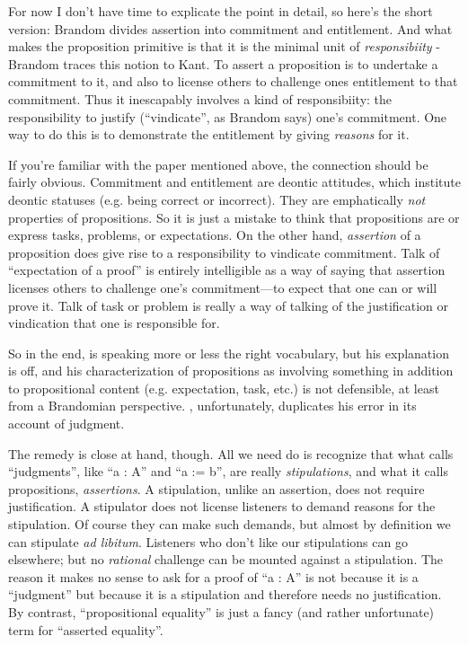 For now I don't have time to explicate the point in detail, so
here's the short version: Brandom divides assertion into commitment
and entitlement.  And what makes the proposition primitive is that
it is the minimal unit of \emph{responsibiity} - Brandom traces this
notion to Kant.  To assert a proposition is to undertake a
commitment to it, and also to license others to challenge ones
entitlement to that commitment.  Thus it inescapably involves a kind
of responsibiity: the responsibility to justify (``vindicate'', as
Brandom says) one's commitment.  One way to do this is to
demonstrate the entitlement by giving \emph{reasons} for it.

If you're familiar with the \ML{} paper mentioned above, the
connection should be fairly obvious.  Commitment and entitlement are
deontic attitudes, which institute deontic statuses (e.g. being
correct or incorrect).  They are emphatically \emph{not} properties
of propositions.  So it is just a mistake to think that propositions
are or express tasks, problems, or expectations.  On the other hand,
\emph{assertion} of a proposition does give rise to a responsibility
to vindicate commitment.  Talk of ``expectation of a proof'' is
entirely intelligible as a way of saying that assertion licenses
others to challenge one's commitment---to expect that one can or
will prove it.  Talk of task or problem is really a way of talking
of the justification or vindication that one is responsible
for.

So in the end, \ML{} is speaking more or less the right vocabulary,
but his explanation is off, and his characterization of propositions
as involving something in addition to propositional content
(e.g. expectation, task, etc.) is not defensible, at least from a
Brandomian perspective.  \HoTT{}, unfortunately, duplicates his
error in its account of judgment.

The remedy is close at hand, though.  All we need do is recognize that
what \HoTTB calls ``judgments'', like ``a : A'' and ``a := b'', are
really \emph{stipulations}, and what it calls propositions,
\emph{assertions}.  A stipulation, unlike an assertion, does not
require justification.  A stipulator does not license listeners to
demand reasons for the stipulation.  Of course they can make such
demands, but almost by definition we can stipulate \emph{ad libitum}.
Listeners who don't like our stipulations can go elsewhere; but no
\emph{rational} challenge can be mounted against a stipulation.  The
reason it makes no sense to ask for a proof of ``a : A'' is not
because it is a ``judgment'' but because it is a stipulation and
therefore needs no justification.  By contrast, ``propositional
equality'' is just a fancy (and rather unfortunate) term for
``asserted equality''.

